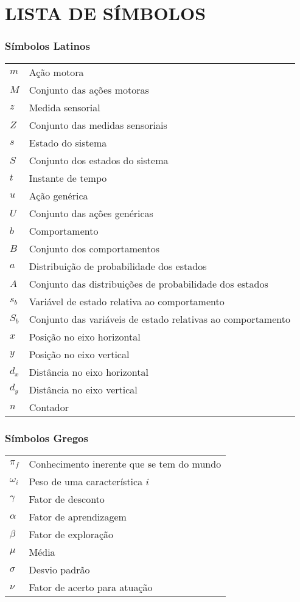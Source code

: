 




\chapter*{LISTA DE SÍMBOLOS}




\subsection*{Símbolos Latinos}

\begin{tabular}{p{}p{}}
$m$  & Ação motora\tabularnewline
$M$  & Conjunto das ações motoras\tabularnewline
$z$  & Medida sensorial\tabularnewline
$Z$  & Conjunto das medidas sensoriais\tabularnewline
$s$  & Estado do sistema\tabularnewline
$S$  & Conjunto dos estados do sistema\tabularnewline
$t$  & Instante de tempo\tabularnewline
$u$  & Ação genérica\tabularnewline
$U$  & Conjunto das ações genéricas\tabularnewline
$b$  & Comportamento\tabularnewline
$B$  & Conjunto dos comportamentos\tabularnewline
$a$  & Distribuição de probabilidade dos estados\tabularnewline
$A$  & Conjunto das distribuições de probabilidade dos estados\tabularnewline
$s_b$  & Variável de estado relativa ao comportamento\tabularnewline
$S_b$  & Conjunto das variáveis de estado relativas ao comportamento\tabularnewline
$x$  & Posição no eixo horizontal\tabularnewline
$y$  & Posição no eixo vertical\tabularnewline
$d_x$  & Distância no eixo horizontal\tabularnewline
$d_y$  & Distância no eixo vertical\tabularnewline
$n$  & Contador\tabularnewline
\end{tabular}


\subsection*{Símbolos Gregos}

\begin{tabular}{p{}p{}}
$\pi_f$  & Conhecimento inerente que se tem do mundo\tabularnewline
$\omega_i$  & Peso de uma característica $ i $\tabularnewline
$\gamma$  & Fator de desconto\tabularnewline
$\alpha$  & Fator de aprendizagem\tabularnewline
$\beta$  & Fator de exploração\tabularnewline
$\mu$  & Média\tabularnewline
$\sigma$  & Desvio padrão\tabularnewline
$\nu$  & Fator de acerto para atuação\tabularnewline
\end{tabular}


